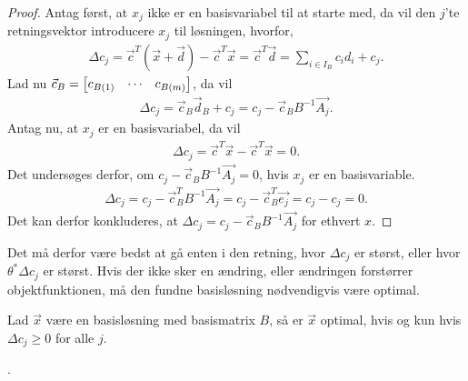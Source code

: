 \begin{proof}
Antag først, at $x_j$ ikke er en basisvariabel til at starte med, da vil den $j$'te retningsvektor introducere $x_j$ til løsningen, hvorfor,
\begin{align*}
\Delta c_j = \vec{c}^T(\vec{x}+ \vec{d}) - \vec{c}^T\vec{x} = \vec{c}^T\vec{d} = \sum_{i \in I_B} c_i d_i + c_j.
\end{align*}
Lad nu $\vec{c}_B = \begin{bmatrix} c_{B(1)}& \cdots & c_{B(m)} \end{bmatrix}$, da vil
\begin{align}
\Delta c_j =\vec{c}_B\vec{d}_B+ c_j = c_j-\vec{c}_B B^{-1}\vec{A_j}.
\end{align}
Antag nu, at $x_j$ er en basisvariabel, da vil 
\begin{align*}
\Delta c_j = \vec{c}^T\vec{x}- \vec{c}^T\vec{x} = 0.
\end{align*}
Det undersøges derfor, om $ c_j-\vec{c}_B B^{-1}\vec{A_j}= 0$, hvis $x_j$ er en basisvariable.
\begin{align*}
 \Delta c_j = c_j-\vec{c}_B^T B^{-1}\vec{A_j} = c_j - \vec{c}_B^T \vec{e_j} = c_j - c_j = 0.
\end{align*}
Det kan derfor konkluderes, at $\Delta c_j = c_j-\vec{c}_B B^{-1}\vec{A_j}$ for ethvert $x$.
\end{proof}

Det må derfor være bedst at gå enten i den retning, hvor $\Delta c_j$ er størst, eller hvor $\theta^*\Delta c_j$ er størst. 
Hvis der ikke sker en ændring, eller ændringen forstørrer objektfunktionen, må den fundne basisløsning nødvendigvis være optimal.

\begin{stn}
Lad $\vec{x}$ være en basisløsning med basismatrix $B$, så er $\vec{x}$ optimal, hvis og kun hvis $\Delta c_j \geq 0$ for alle $j$.
\label{stn:optimalDeltaC}
\end{stn}.

